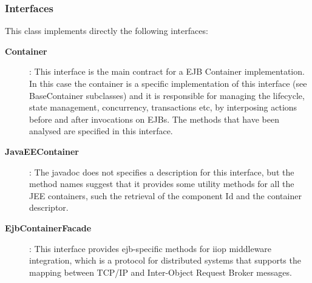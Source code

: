 \documentclass[11pt, a4paper,titlepage]{article}
\begin{document}
	\subsubsection{Interfaces}
	This class implements directly the following interfaces:
	 \begin{description}
	 	\item[\textbf{Container}]: This interface is the main contract for a EJB Container implementation. In this case the container is a specific implementation of this interface (see BaseContainer subclasses) and it is responsible for managing the lifecycle, state management, concurrency, transactions etc, by interposing actions before and after invocations on EJBs.
	 	 The methods that have been analysed are specified in this interface.
	 	 \item[\textbf{JavaEEContainer}]: The javadoc does not specifies a description for this interface, but the method names suggest that it provides some utility methods for all the JEE containers, such the retrieval of the component Id and the container descriptor.
	 	 \item[\textbf{EjbContainerFacade}]: This interface provides ejb-specific methods for iiop middleware integration, which is a protocol for distributed systems that supports the mapping between TCP/IP and Inter-Object Request Broker messages.
	 \end{description}
\end{document}
